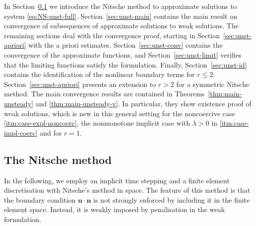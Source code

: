 \documentclass[reqno,a4paper]{amsart}
\def\vec#1{\boldsymbol{#1}}
\def\bn{\vec{n}}
\def\bu{\vec{u}}
\begin{document}
In Section~\ref{sec:unst-Nitsche} we introduce the Nitsche method to approximate solutions to system \eqref{eq:NS-unst-full}. 
Section~\ref{sec:unst-main} contains the main result on convergence of subsequences of approximate solutions to weak solutions. 
The remaining sections deal with the convergence proof, starting in Section~\ref{sec:unst-apriori} with the a priori estimates. 
Section~\ref{sec:unst-conv} contains the convergence of the approximate functions, and Section~\ref{sec:unst-limit} verifies that the limiting functions satisfy the formulation. 
Finally, Section~\ref{sec:unst-id} contains the identification of the nonlinear boundary terms for $r\leq 2$. 
Section~\ref{sec:unst-apriori} presents an extension to $r>2$ for a symmetric Nitsche method.  
The main convergence results are contained in Theorems~\ref{thm:main-unsteady} and \ref{thm:main-unsteady-v}. 
In particular, they show  existence proof of weak solutions, which is new in this general setting 
for the noncoercive case \ref{itm:case-expl-noncoerc}, the nonmonotone implicit case with $\lambda >0$ in \ref{itm:case-impl-coerc} and for $r = 1$. 

\subsection{The Nitsche method}
\label{sec:unst-Nitsche}
In the following, we employ an implicit time stepping and a finite element discretisation with Nitsche's method in space. 
The feature of this method is that the boundary condition $\bu \cdot \bn$ is not strongly enforced by including it in the finite element space. 
Instead, it is weakly imposed by penalisation in the weak formulation. 
\end{document}
